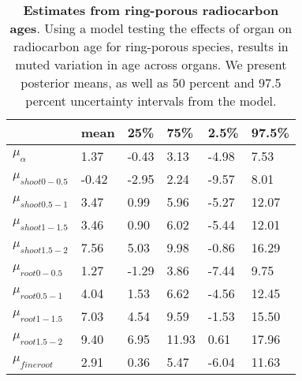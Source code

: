 \documentclass{article}\usepackage[]{graphicx}\usepackage[]{color}
\begin{document}
\begin{table}[ht]
\centering
\caption{\textbf{Estimates from ring-porous radiocarbon ages}. Using a model testing the effects of organ on radiocarbon age for ring-porous species, results in muted variation in age across organs. We present posterior means, as well as 50 percent and 97.5 percent uncertainty intervals from the model.} 
\label{tab:ringradio}
\begingroup\footnotesize
\begin{tabular}{|p{}|p{}|p{}|p{}|p{}|p{}|}
  \hline
 & mean & 25\% & 75\% & 2.5\% & 97.5\% \\ 
  \hline
$\mu_{\alpha}$ & 1.37 & -0.43 & 3.13 & -4.98 & 7.53 \\ 
  $\mu_{shoot 0-0.5}$ & -0.42 & -2.95 & 2.24 & -9.57 & 8.01 \\ 
  $\mu_{shoot 0.5-1}$ & 3.47 & 0.99 & 5.96 & -5.27 & 12.07 \\ 
  $\mu_{shoot 1-1.5}$ & 3.46 & 0.90 & 6.02 & -5.44 & 12.01 \\ 
  $\mu_{shoot 1.5-2}$ & 7.56 & 5.03 & 9.98 & -0.86 & 16.29 \\ 
  $\mu_{root 0-0.5}$ & 1.27 & -1.29 & 3.86 & -7.44 & 9.75 \\ 
  $\mu_{root 0.5-1}$ & 4.04 & 1.53 & 6.62 & -4.56 & 12.45 \\ 
  $\mu_{root 1-1.5}$ & 7.03 & 4.54 & 9.59 & -1.53 & 15.50 \\ 
  $\mu_{root 1.5-2}$ & 9.40 & 6.95 & 11.93 & 0.61 & 17.96 \\ 
  $\mu_{fineroot}$ & 2.91 & 0.36 & 5.47 & -6.04 & 11.63 \\ 
   \hline
\end{tabular}
\endgroup
\end{table}
\end{document}
